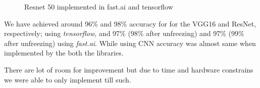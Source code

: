 \documentclass[11pt]{article}
\begin{document}
	\begin{figure}[H]
		\centering
		\hspace{0.5cm}
		\caption{Resnet 50 implemented in fast.ai and tensorflow}
		\label{ResNet 50 in fast.ai and tensorflow}
	\end{figure}

	We have achieved around 96\% and 98\% accuracy for for the VGG16 and ResNet,
	respectively; using \textit{tensorflow}, and 97\% (98\% after unfreezing)
	and 97\% (99\% after unfreezing) using \textit{fast.ai}. While using CNN
	accuracy was almost same when implemented by the both the libraries.

	There are lot of room for improvement but due to time and hardware
	constrains we were able to only implement till such.
\end{document}
